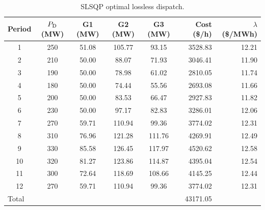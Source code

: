 \begin{table}[H]
\centering
\caption{SLSQP optimal lossless dispatch.}
\label{tab:slsqp}
\begin{tabular}{cccccrr}
\toprule
Period & $P_{\mathrm{D}}$ (MW) & G1 (MW) & G2 (MW) & G3 (MW) & Cost (\$/h) & $\lambda$ (\$/MWh)\\
\midrule
1 & 250 & 51.08 & 105.77 & 93.15 & 3528.83 & 12.21\\
2 & 210 & 50.00 & 88.07 & 71.93 & 3046.41 & 11.90\\
3 & 190 & 50.00 & 78.98 & 61.02 & 2810.05 & 11.74\\
4 & 180 & 50.00 & 74.44 & 55.56 & 2693.08 & 11.66\\
5 & 200 & 50.00 & 83.53 & 66.47 & 2927.83 & 11.82\\
6 & 230 & 50.00 & 97.17 & 82.83 & 3286.01 & 12.06\\
7 & 270 & 59.71 & 110.94 & 99.36 & 3774.02 & 12.31\\
8 & 310 & 76.96 & 121.28 & 111.76 & 4269.91 & 12.49\\
9 & 330 & 85.58 & 126.45 & 117.97 & 4520.62 & 12.58\\
10 & 320 & 81.27 & 123.86 & 114.87 & 4395.04 & 12.54\\
11 & 300 & 72.64 & 118.69 & 108.66 & 4145.25 & 12.44\\
12 & 270 & 59.71 & 110.94 & 99.36 & 3774.02 & 12.31\\
\midrule
\multicolumn{5}{l}{Total} & 43171.05 & \\
\bottomrule
\end{tabular}
\end{table}
